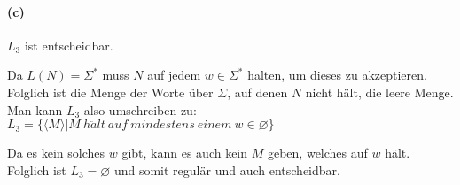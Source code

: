 	
\paragraph{(c)}
	$L_3$ ist entscheidbar.

	Da $L(N)=\Sigma^*$ muss $N$ auf jedem $w \in \Sigma^*$ halten, um dieses zu akzeptieren. Folglich ist die Menge der Worte über $\Sigma$, auf denen $N$ nicht hält, die leere Menge. Man kann $L_3$ also umschreiben zu:\\
	$L_3= \{\langle M\rangle | M\ h\ddot{a}lt\ auf\ mindestens\ einem\ w \in \varnothing \}$

	Da es kein solches $w$ gibt, kann es auch kein $M$ geben, welches auf $w$ hält. Folglich ist $L_3 = \varnothing$ und somit regulär und auch entscheidbar. 
	
